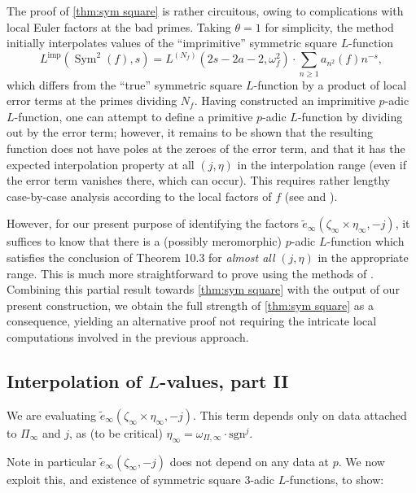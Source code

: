 \documentclass[10pt,reqno,a4paper]{amsart}
\begin{document}
\begin{remark}
The proof of \cref{thm:sym square} is rather circuitous, owing to complications with local Euler factors at the bad primes.
Taking $\theta = 1$ for simplicity, the method initially interpolates values of the ``imprimitive'' symmetric square $L$-function
\[
L^{\mathrm{imp}}(\operatorname{Sym}^2(f), s) = L^{(N_f)}(2s - 2a - 2, \omega_f^2) \cdot \sum_{n \ge 1} a_{n^2}(f) n^{-s},
\]
which differs from the ``true'' symmetric square $L$-function by a product of local error terms at the primes dividing $N_f$. Having constructed an imprimitive $p$-adic $L$-function, one can attempt to define a primitive $p$-adic $L$-function by dividing out by the error term; however, it remains to be shown that the resulting function does not have poles at the zeroes of the error term, and that it has the expected interpolation property at all $(j, \eta)$ in the interpolation range (even if the error term vanishes there, which can occur). This requires rather lengthy case-by-case analysis according to the local factors of $f$ (see \cite[\S 6]{Hid90} and \cite[\S 3.1]{DD97}).

However, for our present purpose of identifying the factors $\widetilde{e}_\infty(\zeta_\infty \times \eta_\infty,-j)$, it suffices to know that there is a (possibly meromorphic)  $p$-adic $L$-function which satisfies the conclusion of Theorem 10.3 for \emph{almost all} $(j, \eta)$ in the appropriate range. This is much more straightforward to prove using the methods of \cite{Sch88}. Combining this partial result towards \cref{thm:sym square} with the output of our present construction, we obtain the full strength of \cref{thm:sym square} as a consequence, yielding an alternative proof not requiring the intricate local computations involved in the previous approach.
\end{remark}




\subsection{Interpolation of \texorpdfstring{$L$}{L}-values, part II}\label{sec:interpolation 2}
We are evaluating $\widetilde{e}_\infty(\zeta_\infty \times \eta_\infty,-j)$. This term depends only on data attached to $\Pi_\infty$ and $j$, as (to be critical) $\eta_\infty = \omega_{\Pi,\infty} \cdot \mathrm{sgn}^j$.

Note in particular $\widetilde{e}_\infty(\zeta_\infty,-j)$ does not depend on any data at $p$. We now exploit this, and existence of symmetric square $3$-adic $L$-functions, to show:
\end{document}
